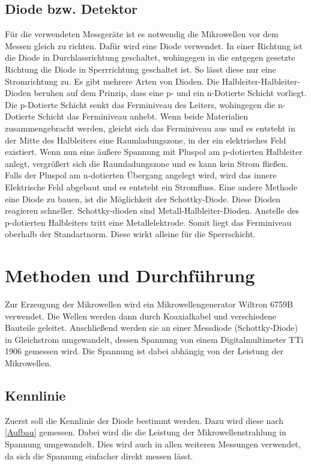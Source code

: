 \subsection{Diode bzw. Detektor}
Für die verwendeten Messgeräte ist es notwendig die Mikrowellen vor dem Messen gleich zu richten. Dafür wird eine Diode verwendet. In einer Richtung ist die Diode in Durchlassrichtung geschaltet, wohingegen in die entgegen gesetzte Richtung die Diode in Sperrrichtung geschaltet ist. So lässt diese nur eine Stromrichtung zu.
Es gibt mehrere Arten von Dioden. 
Die Halbleiter-Halbleiter-Dioden beruhen auf dem Prinzip, dass eine p- und ein n-Dotierte Schicht vorliegt. Die p-Dotierte Schicht senkt das Ferminiveau des Leiters, wohingegen die n-Dotierte Schicht das Ferminiveau anhebt. Wenn beide Materialien zusammengebracht werden, gleicht sich das Ferminiveau aus und es entsteht in der Mitte des Halbleiters eine Raumladungszone, in der ein elektrisches Feld existiert. Wenn nun eine äußere Spannung mit Pluspol am p-dotierten Halbleiter anlegt, vergrößert sich die Raumladungszone und es kann kein Strom fließen. Falls der Pluspol am n-dotierten Übergang angelegt wird, wird das innere Elektrische Feld abgebaut und es entsteht ein Stromfluss.
Eine andere Methode eine Diode zu bauen, ist die Möglichkeit der Schottky-Diode. Diese Dioden reagieren schneller. Schottky-dioden sind Metall-Halbleiter-Dioden. Anstelle des p-dotierten Halbleiters tritt eine Metallelektrode. Somit liegt das Ferminiveau oberhalb der Standartnorm. Diese wirkt alleine für die Sperrschicht. 


\section{Methoden und Durchführung}
Zur Erzeugung der Mikrowellen wird ein Mikrowellengenerator Wiltron 6759B verwendet. Die Wellen werden dann durch Koaxialkabel und verschiedene Bauteile geleitet. Anschließend werden sie an einer Messdiode (Schottky-Diode) in Gleichstrom umgewandelt, dessen Spannung von einem Digitalmultimeter TTi 1906 gemessen wird. Die Spannung ist dabei abhängig von der Leistung der Mikrowellen.
\subsection{Kennlinie}
Zuerst soll die Kennlinie der Diode bestimmt werden. Dazu wird diese nach \cref{Aufbau} gemessen. Dabei wird die die Leistung der Mikrowellenstrahlung in Spannung umgewandelt. Dies wird auch in allen weiteren Messungen verwendet, da sich die Spannung einfacher direkt messen lässt.

